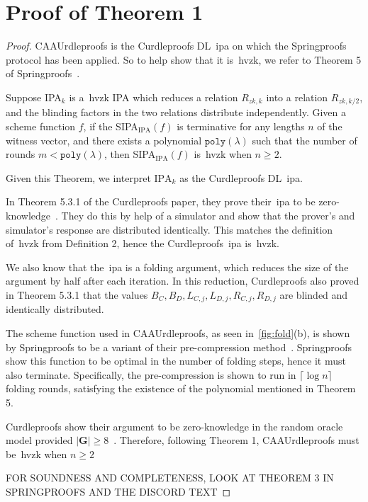 
\section{Proof of Theorem 1}\label{sec:appendix-thm1proof}
\begin{proof}
    CAAUrdleproofs is the Curdleproofs DL~\gls{ipa} on which the Springproofs protocol has been applied.
    So to help show that it is~\gls{hvzk}, we refer to Theorem 5 of Springproofs~\cite{zhang2024springproofs}.
    \begin{theorem}
        Suppose IPA$_k$ is a~\gls{hvzk} IPA which reduces a relation $R_{zk,k}$ into a relation $R_{zk,k/2}$, and the blinding factors in the two relations distribute independently.
        Given a scheme function $f$, if the SIPA$_{\text{IPA}}(f)$ is terminative for any lengths $n$ of the witness vector, and there exists a polynomial $\texttt{poly}(\lambda)$ such that the number of rounds $m<\texttt{poly}(\lambda)$, then SIPA$_{\text{IPA}}(f)$ is~\gls{hvzk} when $n\geq2$.
    \end{theorem}
    Given this Theorem, we interpret $\text{IPA}_k$ as the Curdleproofs DL~\gls{ipa}.

    In Theorem 5.3.1 of the Curdleproofs paper, they prove their~\gls{ipa} to be zero-knowledge~\cite{Curdleproofs}.
    They do this by help of a simulator and show that the prover's and simulator's response are distributed identically.
    This matches the definition of~\gls{hvzk} from Definition 2, hence the Curdleproofs~\gls{ipa} is~\gls{hvzk}.

    We also know that the~\gls{ipa} is a folding argument, which reduces the size of the argument by half after each iteration.
    In this reduction, Curdleproofs also proved in Theorem 5.3.1 that the values $B_C,B_D,L_{C,j},L_{D,j},R_{C,j},R_{D,j}$ are blinded and identically distributed.

    The scheme function used in CAAUrdleproofs, as seen in~\autoref{fig:fold}(b), is shown by Springproofs to be a variant of their pre-compression method~\cite{zhang2024springproofs}.
    Springproofs show this function to be optimal in the number of folding steps, hence it must also terminate.
    Specifically, the pre-compression is shown to run in $\lceil \log n\rceil$ folding rounds, satisfying the existence of the polynomial mentioned in Theorem 5.

    Curdleproofs show their argument to be zero-knowledge in the random oracle model provided $|\mathbf{G}|\geq8$~\cite{Curdleproofs}.
    Therefore, following Theorem 1, CAAUrdleproofs must be~\gls{hvzk} when $n\geq2$

    FOR SOUNDNESS AND COMPLETENESS, LOOK AT THEOREM 3 IN SPRINGPROOFS AND THE DISCORD TEXT
\end{proof}



